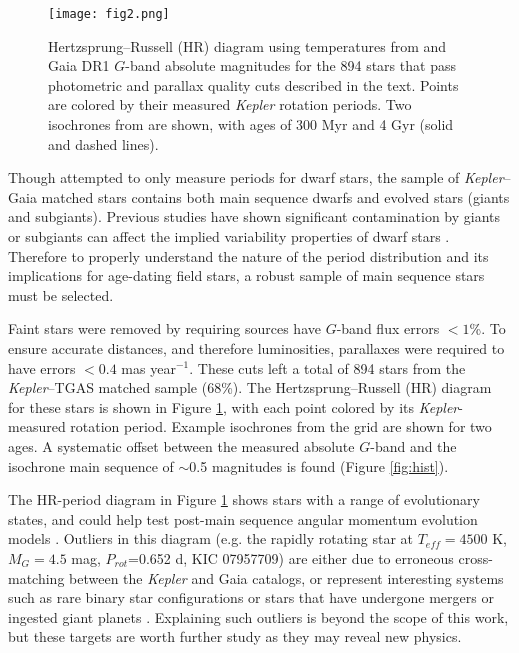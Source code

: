\documentclass[manuscript, letterpaper]{aastex6}
\makeatletter
\let\origsection\section
\renewcommand\section{\@ifstar{\starsection}{\nostarsection}}
\newcommand\nostarsection[1]{\sectionprelude\origsection{#1}}
\newcommand\starsection[1]{\sectionprelude\origsection*{#1}}
\newcommand\sectionprelude{\vspace{1em}}
\newcommand{\Kepler}{\textsl{Kepler}\xspace}
\makeatother
\begin{document}
\begin{figure}[]
\centering
\texttt{[image: fig2.png]}
\caption{Hertzsprung--Russell (HR) diagram using temperatures from \citet{mcquillan2014} and Gaia DR1 $G$-band absolute magnitudes for the 894 stars that pass photometric and parallax quality cuts described in the text. Points are colored by their measured \Kepler rotation periods. Two isochrones from \citet{bressan2012} are shown, with ages of 300 Myr and 4 Gyr (solid and dashed lines).
}
\label{fig:HR}
\end{figure}

\section{Selecting Main Sequence Stars}

Though \citet{mcquillan2014} attempted to only measure periods for dwarf stars, the sample of \Kepler--Gaia matched stars contains both main sequence dwarfs and evolved stars (giants and subgiants). Previous studies have shown  significant contamination by giants or subgiants can affect the implied variability properties of dwarf stars \citep{ciardi2011,mann2012}. Therefore to properly understand the nature of the period distribution and its implications for age-dating field stars, a robust sample of main sequence stars must be selected.

Faint stars were removed by requiring sources have $G$-band flux errors $<1$\%. To ensure accurate distances, and therefore luminosities, parallaxes were required to have errors $<0.4$ mas year$^{-1}$. These cuts left a total of 894 stars from the \Kepler--TGAS matched sample (68\%). The Hertzsprung--Russell (HR) diagram for these stars is shown in Figure \ref{fig:HR}, with each point colored by its \Kepler-measured rotation period. Example isochrones from the \citet{bressan2012} grid are shown for two ages. A systematic offset between the measured absolute $G$-band and the isochrone main sequence of $\sim$0.5 magnitudes is found (Figure \ref{fig:hist}). 

The HR-period diagram in Figure \ref{fig:HR} shows stars with a range of evolutionary states, and could help test post-main sequence angular momentum evolution models \citep[e.g.][]{donascimento2012}. Outliers in this diagram (e.g. the rapidly rotating star at $T_{eff}=4500$ K, $M_G=4.5$ mag, $P_{rot}$=0.652 d, KIC 07957709) are either due to erroneous cross-matching between the \Kepler and Gaia catalogs, or represent interesting systems such as rare binary star configurations or stars that have undergone mergers or ingested giant planets \citep{massarotti2008,tayar2015}. Explaining such outliers is beyond the scope of this work, but these targets are worth further study as they may reveal new physics.
\end{document}
